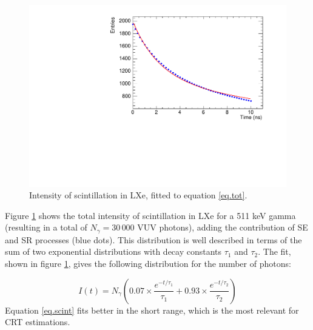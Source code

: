 \documentclass[11pt,a4paper]{article}
\begin{document}
\begin{figure}[!bhtp]
	\centering
	\includegraphics[scale=0.6]{img/Fit10ns_ROOT.pdf}
	\caption{\label{fig.scint} Intensity of scintillation in LXe, fitted to equation \ref{eq.tot}. }
\end{figure}

Figure \ref{fig.scint} shows the total intensity of scintillation in LXe for a 511 keV gamma (resulting in a total of $N_\gamma =30\,000$ VUV photons), adding the contribution of SE and SR processes (blue dots). This distribution is well described in terms of the sum of two exponential distributions with decay constants $\tau_1$ and $\tau_2$. The fit, shown in figure \ref{fig.scint}, gives the following distribution for the number of photons: 

\begin{equation}
I(t) = N_\gamma (0.07 \times \frac{e^{-t/\tau_1}}{\tau_1} + 0.93 \times \frac{e^{-t/\tau_2}}{\tau_2})
\label{eq.scint}
\end{equation}
%
Equation \ref{eq.scint} fits better in the short range, which is the most relevant for CRT estimations.
\end{document}
